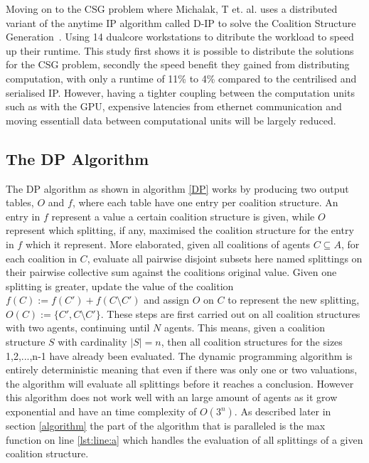 \documentclass{llncs}
\begin{document}
Moving on to the CSG problem where Michalak, T et. al. uses a distributed variant of the anytime IP algorithm called
D-IP to solve the Coalition Structure Generation~\cite{michalak2010distributed}.
Using 14 dualcore workstations to ditribute the workload to speed up their runtime.
This study first shows it is possible to distribute the solutions for the CSG problem,
secondly the speed benefit they gained from distributing computation, 
with only a runtime of 11\% to 4\%  compared to the centrilised and serialised IP.
However, having a tighter coupling between the computation units such as with the GPU, 
expensive latencies from ethernet communication and moving essentiall data between computational units will be largely reduced.



\subsection{The {DP} Algorithm} 


The DP algorithm as shown in algorithm \ref{DP} works by producing two output tables, $O$ and $f$, 
where each table have one entry per coalition structure. 
An entry in $f$ represent a value a certain coalition structure is given, 
while $O$ represent which splitting, if any, maximised the coalition structure for the entry in $f$ which it represent.
More elaborated, given all coalitions of agents $C\subseteq A$, for each coalition in $C$, evaluate all
pairwise disjoint subsets here named splittings on their pairwise collective sum against the coalitions
original value. Given one splitting is greater, update the value of the coalition $f(C) := f(C') + f(C\setminus C')$
and assign $O$ on $C$ to represent the new splitting, $O(C) := \{C',C\setminus C'\}$. These steps are first carried out
on all coalition structures with two agents, continuing until $N$ agents. 
This means, given a coalition structure $S$ with cardinality $|S| = n$, then all coalition structures
for the sizes 1,2,...,n-1 have already been evaluated. The dynamic programming algorithm is entirely deterministic meaning
that even if there was only one or two valuations, the algorithm will evaluate all splittings before it reaches a conclusion.
However this algorithm does not work well with an large amount of agents as it grow exponential and have an time complexity of $O(3^n)$.
As described later in section \ref{algorithm} the part of the algorithm that is paralleled is the max function on line \ref{lst:line:a}
which handles the evaluation of all splittings of a given coalition structure.
\end{document}

